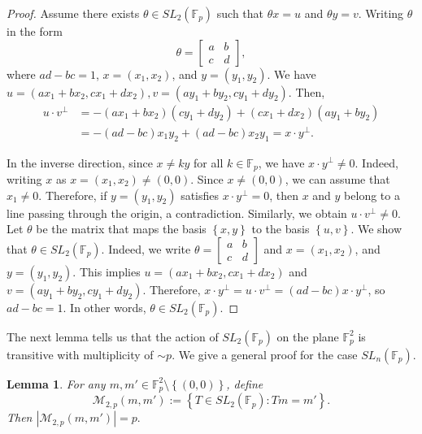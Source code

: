\documentclass[11pt]{article}
\newtheorem{lemma}[theorem]{Lemma}
\def\M{\mathcal{M}}
\def\Fbb{\mathbb{F}}
\def\SL{SL}
\def\l({\left(}
\def\r){\right)}
\def\lo{\left\{}
\def\ro{\right\}}
\begin{document}
\begin{proof}
    Assume there exists $\theta \in \SL_2(\mathbb{F}_p)$ such that $\theta x=u$ and $\theta y=v$. Writing $\theta$ in the form 
    \[ \theta = \begin{bmatrix}
        a & b \\
        c & d
    \end{bmatrix} ,\]
    where $ad-bc=1$, $x=(x_1 ,x_2)$, and $y= (y_1 ,y_2)$. We have $u=(ax_1 +bx_2,cx_1 +dx_2) ,v = (ay_1 +by_2,cy_1 +dy_2) $. Then, 
    \begin{align*}
        u\cdot v^\perp &= -(ax_1+bx_2)(cy_1+dy_2) + (cx_1+dx_2)(ay_1+by_2) \\
        &= -(ad-bc)x_1y_2 +(ad-bc)x_2y_1 = x\cdot y^\perp .
    \end{align*}

In the inverse direction, since $x \ne ky$ for all $k \in \Fbb_p$, we have $x\cdot y^\perp \ne 0$. Indeed, writing $x$ as $x=\l( x_1,x_2 \r) \ne (0, 0)$. Since $x \ne (0, 0)$, we can assume that $x_1 \ne 0$. Therefore, if $y=\l( y_1,y_2 \r)$ satisfies $x\cdot y^\perp =0$, then $x$ and $y$ belong to a line passing through the origin, a contradiction. Similarly, we obtain $u\cdot v^\perp\ne 0$. Let $\theta$ be the matrix that maps the basis  $\lo x,y\ro$ to the basis $\lo u,v\ro$. We show that $\theta \in \SL_2(\mathbb{F}_p)$. Indeed, we write $\theta = \begin{bmatrix}
        a & b\\ 
        c & d
    \end{bmatrix}$ and $x= (x_1 ,x_2)$, and $y=(y_1 ,y_2)$. This implies $u=(ax_1 +bx_2,cx_1 +dx_2)$ and $v = (ay_1 +by_2,cy_1 +dy_2) $. Therefore, $x \cdot y^\perp = u\cdot v^\perp = (ad-bc)x\cdot y^\perp$, so $ad-bc=1$. In other words, $\theta\in SL_2(\mathbb{F}_p)$. 
\end{proof}

The next lemma tells us that the action of $SL_2(\mathbb{F}_p)$ on the plane $\mathbb{F}_p^2$ is transitive with multiplicity of $\sim p$. We give a general proof for the case $SL_n(\mathbb{F}_p)$. 
\begin{lemma}\label{lmmay1}
    For any $m,m'\in \Fbb_p^2 \setminus \lo (0,0)\ro $, define
    \[\M_{2,p}\l( m, m' \r) := \lo T\in \SL_2 \l( \Fbb_p \r) \colon Tm=m' \ro . \]
   Then  $|\M_{2,p}\l( m, m' \r)|= p.$
\end{lemma}
\end{document}

